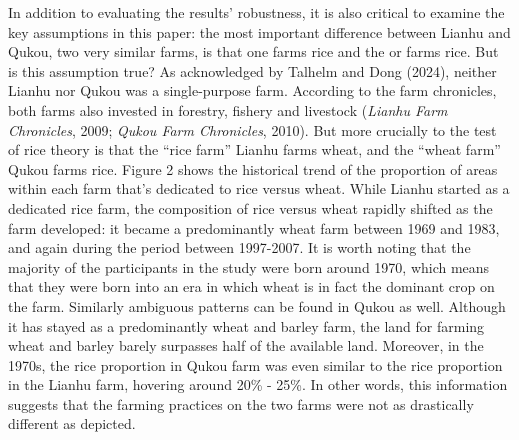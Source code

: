 \documentclass[
  man]{apa6}
\begin{document}
In addition to evaluating the results' robustness, it is also critical to examine the key assumptions in this paper: the most important difference between Lianhu and Qukou, two very similar farms, is that one farms rice and the or farms rice. But is this assumption true? As acknowledged by Talhelm and Dong (2024), neither Lianhu nor Qukou was a single-purpose farm. According to the farm chronicles, both farms also invested in forestry, fishery and livestock (\emph{Lianhu Farm Chronicles}, 2009; \emph{Qukou Farm Chronicles}, 2010). But more crucially to the test of rice theory is that the ``rice farm'' Lianhu farms wheat, and the ``wheat farm'' Qukou farms rice. Figure 2 shows the historical trend of the proportion of areas within each farm that's dedicated to rice versus wheat. While Lianhu started as a dedicated rice farm, the composition of rice versus wheat rapidly shifted as the farm developed: it became a predominantly wheat farm between 1969 and 1983, and again during the period between 1997-2007. It is worth noting that the majority of the participants in the study were born around 1970, which means that they were born into an era in which wheat is in fact the dominant crop on the farm. Similarly ambiguous patterns can be found in Qukou as well. Although it has stayed as a predominantly wheat and barley farm, the land for farming wheat and barley barely surpasses half of the available land. Moreover, in the 1970s, the rice proportion in Qukou farm was even similar to the rice proportion in the Lianhu farm, hovering around 20\% - 25\%. In other words, this information suggests that the farming practices on the two farms were not as drastically different as depicted.
\end{document}
